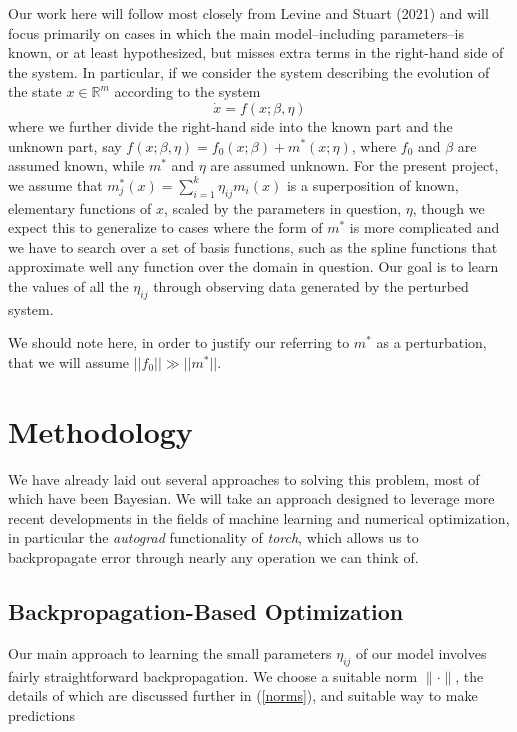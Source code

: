 \documentclass[12pt]{article}
\begin{document}
Our work here will follow most closely from Levine and Stuart (2021) and will focus primarily on cases in which the main model\---including parameters\---is known, or at least hypothesized, but misses extra terms in the right-hand side of the system. In particular, if we consider the system describing the evolution of the state $x \in \mathbb{R}^m$ according to the system $$\dot{x} = f(x;\beta, \eta)$$ where we further divide the right-hand side into the known part and the unknown part, say $f(x;\beta, \eta) = f_0(x; \beta) + m^*(x; \eta)$, where $f_0$ and $\beta$ are assumed known, while $m^*$ and $\eta$ are assumed unknown. For the present project, we assume that $m_j^*(x) = \sum_{i=1}^k \eta_{ij} m_i(x)$ is a superposition of known, elementary functions of $x$, scaled by the parameters in question, $\eta$, though we expect this to generalize to cases where the form of $m^*$ is more complicated and we have to search over a set of basis functions, such as the spline functions that approximate well any function over the domain in question. Our goal is to learn the values of all the $\eta_{ij}$ through observing data generated by the perturbed system.

We should note here, in order to justify our referring to $m^*$ as a perturbation, that we will assume $||f_0|| \gg ||m^*||$.




\section{Methodology}

We have already laid out several approaches to solving this problem, most of which have been Bayesian. We will take an approach designed to leverage more recent developments in the fields of machine learning and numerical optimization, in particular the \textit{autograd} functionality of \textit{torch}, which allows us to backpropagate error through nearly any operation we can think of.



\subsection{Backpropagation-Based Optimization}

Our main approach to learning the small parameters $\eta_{ij}$ of our model involves fairly straightforward backpropagation. We choose a suitable norm $\|\cdot\|$, the details of which are discussed further in (\ref{norms}), and suitable way to make predictions
\end{document}
